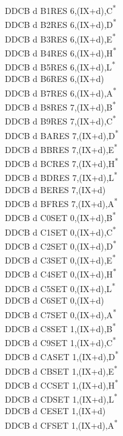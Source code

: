 \documentclass[oneside,a4paper]{book}
\begin{document}
\begin{multicols}{3}
{\begin{tabbing}
DDCB d B1\>RES 6,(IX+d),C\textsuperscript{*}\\
DDCB d B2\>RES 6,(IX+d),D\textsuperscript{*}\\
DDCB d B3\>RES 6,(IX+d),E\textsuperscript{*}\\
DDCB d B4\>RES 6,(IX+d),H\textsuperscript{*}\\
DDCB d B5\>RES 6,(IX+d),L\textsuperscript{*}\\
DDCB d B6\>RES 6,(IX+d)\\
DDCB d B7\>RES 6,(IX+d),A\textsuperscript{*}\\
DDCB d B8\>RES 7,(IX+d),B\textsuperscript{*}\\
DDCB d B9\>RES 7,(IX+d),C\textsuperscript{*}\\
DDCB d BA\>RES 7,(IX+d),D\textsuperscript{*}\\
DDCB d BB\>RES 7,(IX+d),E\textsuperscript{*}\\
DDCB d BC\>RES 7,(IX+d),H\textsuperscript{*}\\
DDCB d BD\>RES 7,(IX+d),L\textsuperscript{*}\\
DDCB d BE\>RES 7,(IX+d)\\
DDCB d BF\>RES 7,(IX+d),A\textsuperscript{*}\\
DDCB d C0\>SET 0,(IX+d),B\textsuperscript{*}\\
DDCB d C1\>SET 0,(IX+d),C\textsuperscript{*}\\
DDCB d C2\>SET 0,(IX+d),D\textsuperscript{*}\\
DDCB d C3\>SET 0,(IX+d),E\textsuperscript{*}\\
DDCB d C4\>SET 0,(IX+d),H\textsuperscript{*}\\
DDCB d C5\>SET 0,(IX+d),L\textsuperscript{*}\\
DDCB d C6\>SET 0,(IX+d)\\
DDCB d C7\>SET 0,(IX+d),A\textsuperscript{*}\\
DDCB d C8\>SET 1,(IX+d),B\textsuperscript{*}\\
DDCB d C9\>SET 1,(IX+d),C\textsuperscript{*}\\
DDCB d CA\>SET 1,(IX+d),D\textsuperscript{*}\\
DDCB d CB\>SET 1,(IX+d),E\textsuperscript{*}\\
DDCB d CC\>SET 1,(IX+d),H\textsuperscript{*}\\
DDCB d CD\>SET 1,(IX+d),L\textsuperscript{*}\\
DDCB d CE\>SET 1,(IX+d)\\
DDCB d CF\>SET 1,(IX+d),A\textsuperscript{*}\\

\end{tabbing}}
\end{multicols}
\end{document}
